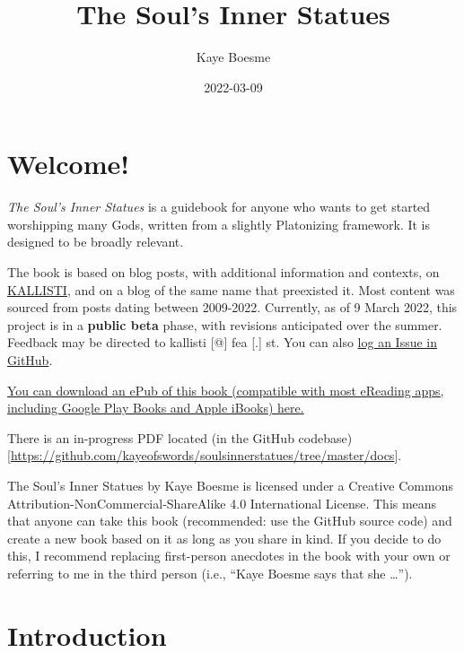\documentclass[
]{book}
\title{The Soul's Inner Statues}
\author{Kaye Boesme}
\date{2022-03-09}
\begin{document}
\maketitle

{
\setcounter{tocdepth}{1}
\tableofcontents
}
\hypertarget{welcome}{%
\chapter{Welcome!}\label{welcome}}

\emph{The Soul's Inner Statues} is a guidebook for anyone who wants to get started worshipping many Gods, written from a slightly Platonizing framework. It is designed to be broadly relevant.

The book is based on blog posts, with additional information and contexts, on \href{https://kallisti.blog}{KALLISTI}, and on a blog of the same name that preexisted it. Most content was sourced from posts dating between 2009-2022. Currently, as of 9 March 2022, this project is in a \textbf{public beta} phase, with revisions anticipated over the summer. Feedback may be directed to kallisti {[}@{]} fea {[}.{]} st. You can also \href{https://github.com/kayeofswords/soulsinnerstatues/}{log an Issue in GitHub}.

\href{souls-inner-statues.epub}{You can download an ePub of this book (compatible with most eReading apps, including Google Play Books and Apple iBooks) here.}

There is an in-progress PDF located (in the GitHub codebase){[}\url{https://github.com/kayeofswords/soulsinnerstatues/tree/master/docs}{]}.

{The Soul's Inner Statues} by Kaye Boesme is licensed under a Creative Commons Attribution-NonCommercial-ShareAlike 4.0 International License. This means that anyone can take this book (recommended: use the GitHub source code) and create a new book based on it as long as you share in kind. If you decide to do this, I recommend replacing first-person anecdotes in the book with your own or referring to me in the third person (i.e., ``Kaye Boesme says that she \ldots{}'').

\hypertarget{intro}{%
\chapter{Introduction}\label{intro}}
\end{document}
